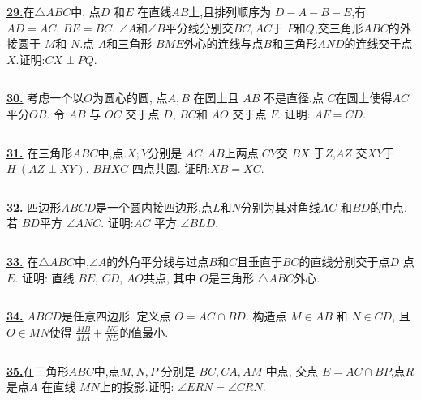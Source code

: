 \documentclass{article}
\begin{document}
$$ $$


\href{http://www.artofproblemsolving.com/Forum/viewtopic.php?p=1099544#p1099544
 }{\bf 29.}在$ \triangle ABC$中, 点$ D$ 和$ E$ 在直线$ AB$上,且排列顺序为 $ D - A - B - E$,有 $AD = AC$, $ BE = BC$. $\angle A$和$\angle B$平分线分别交$ BC,AC$于 $ P$和$ Q$,交三角形$ ABC$的外接圆于 $ M$和 $ N$.点 $ A$和三角形 $ BME$外心的连线与点$ B$和三角形$ AND$的连线交于点$ X$.证明:$ CX \perp PQ$.



$$ $$

\href{http://www.artofproblemsolving.com/Forum/viewtopic.php?p=1004026#p1004026
 }{\bf 30.} 考虑一个以$O$为圆心的圆, 点$A,B$ 在圆上且 $AB$ 不是直径.点 $C$在圆上使得$AC$平分$OB.$ 令 $AB$ 与 $OC$ 交于点 $D$, $BC$和 $AO$ 交于点 $F.$ 证明: $AF=CD.$




$$ $$

\href{ http://www.artofproblemsolving.com/Forum/viewtopic.php?p=962592#p962592
}{\bf 31.} 在三角形$ ABC$中,点.$ X;Y$分别是 $ AC;AB$上两点.$ CY$交 $ BX$ 于$ Z$,$ AZ$ 交$ XY$于 $ H \ (AZ \perp XY)$. $ BHXC$ 四点共圆.
证明:$ XB=XC.$



$$ $$

\href{ http://www.artofproblemsolving.com/Forum/viewtopic.php?p=22914#p22914
}{\bf 32.} 四边形$ABCD$是一个圆内接四边形,点$L$和$N$分别为其对角线$AC$ 和$BD$的中点. 若 $BD$平方 $\angle ANC$. 证明:$AC$ 平方 $\angle BLD$.



$$ $$

\href{http://www.artofproblemsolving.com/Forum/viewtopic.php?p=868538#p868538
 }{\bf 33.} 在$\triangle ABC$中,$\angle A$的外角平分线与过点$B$和$C$且垂直于$BC$的直线分别交于点$D$ 点$E$. 证明: 直线 $BE$, $CD$, $AO$共点, 其中 $O$是三角形 $\triangle ABC$外心.



$$ $$

\href{http://www.artofproblemsolving.com/Forum/viewtopic.php?p=727178#p727178}{\bf 34.} $ABCD$是任意四边形. 定义点 $O= AC\cap BD$. 构造点 $M\in AB$ 和 $N\in CD$, 且$O\in MN$使得 $\displaystyle\frac{MB}{MA}+\frac{NC}{ND}$的值最小.



$$ $$

\href{ http://www.artofproblemsolving.com/Forum/viewtopic.php?p=365242#p365242}{\bf 35.}在三角形$ABC$中,点$M,N,P$ 分别是 $BC,CA,AM$ 中点, 交点 $E= AC\cap BP$,点$R$ 是点$A$ 在直线 $MN$上的投影.证明: $\angle ERN= \angle CRN$.
\end{document}
